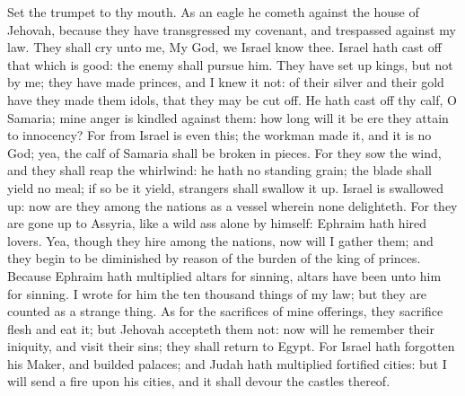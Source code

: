 Set the trumpet to thy mouth. As an eagle he cometh against the house of Jehovah, because they have transgressed my covenant, and trespassed against my law. They shall cry unto me, My God, we Israel know thee. Israel hath cast off that which is good: the enemy shall pursue him. They have set up kings, but not by me; they have made princes, and I knew it not: of their silver and their gold have they made them idols, that they may be cut off. He hath cast off thy calf, O Samaria; mine anger is kindled against them: how long will it be ere they attain to innocency? For from Israel is even this; the workman made it, and it is no God; yea, the calf of Samaria shall be broken in pieces. For they sow the wind, and they shall reap the whirlwind: he hath no standing grain; the blade shall yield no meal; if so be it yield, strangers shall swallow it up.  Israel is swallowed up: now are they among the nations as a vessel wherein none delighteth. For they are gone up to Assyria, like a wild ass alone by himself: Ephraim hath hired lovers. Yea, though they hire among the nations, now will I gather them; and they begin to be diminished by reason of the burden of the king of princes.  Because Ephraim hath multiplied altars for sinning, altars have been unto him for sinning. I wrote for him the ten thousand things of my law; but they are counted as a strange thing. As for the sacrifices of mine offerings, they sacrifice flesh and eat it; but Jehovah accepteth them not: now will he remember their iniquity, and visit their sins; they shall return to Egypt. For Israel hath forgotten his Maker, and builded palaces; and Judah hath multiplied fortified cities: but I will send a fire upon his cities, and it shall devour the castles thereof. 

